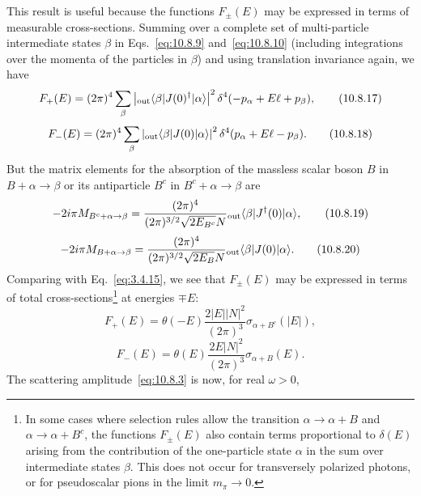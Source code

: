 This result is useful because the functions $F_\pm(E)$ may be expressed
in terms of measurable cross-sections. Summing over a complete set of
multi-particle intermediate states $\beta$ in Eqs.~\eqref{eq:10.8.9}
and~\eqref{eq:10.8.10} (including integrations over the momenta of the
particles in $\beta$) and using translation invariance again, we have
\begin{equation}
  F_+(E)=(2\pi)^4\sum_\beta
  \left|{}_{\mathrm{out}}\langle \beta\rvert J(0)^\dagger\lvert \alpha\rangle\right|^2
  \delta^4(-p_\alpha+E\ell+p_\beta),
  \tag{10.8.17}\label{eq:10.8.17}
\end{equation}
\begin{equation}
  F_-(E)=(2\pi)^4\sum_\beta
  \left|{}_{\mathrm{out}}\langle \beta\rvert J(0)\lvert \alpha\rangle\right|^2
  \delta^4(p_\alpha+E\ell-p_\beta).
  \tag{10.8.18}\label{eq:10.8.18}
\end{equation}
But the matrix elements for the absorption of the massless scalar boson
$B$ in $B+\alpha\to\beta$ or its antiparticle $B^c$ in
$B^c+\alpha\to\beta$ are
\begin{equation}
  -2i\pi M_{B^c+\alpha\to\beta}
  =\frac{(2\pi)^4}{(2\pi)^{3/2}\sqrt{2E_{B^c}}N}
  {}_{\mathrm{out}}\langle \beta\rvert J^\dagger(0)\lvert \alpha\rangle,
  \tag{10.8.19}\label{eq:10.8.19}
\end{equation}
\begin{equation}
  -2i\pi M_{B+\alpha\to\beta}
  =\frac{(2\pi)^4}{(2\pi)^{3/2}\sqrt{2E_B}N}
  {}_{\mathrm{out}}\langle \beta\rvert J(0)\lvert \alpha\rangle.
  \tag{10.8.20}\label{eq:10.8.20}
\end{equation}
Comparing with Eq.~\eqref{eq:3.4.15}, we see that $F_\pm(E)$ may be
expressed in terms of total cross-sections\footnote{In some cases where
selection rules allow the transition $\alpha\to\alpha+B$ and
$\alpha\to\alpha+B^c$, the functions $F_\pm(E)$ also contain terms
proportional to $\delta(E)$ arising from the contribution of the one-particle
state $\alpha$ in the sum over intermediate states $\beta$. This does not
occur for transversely polarized photons, or for pseudoscalar pions in the
limit $m_\pi\to0$.} at energies $\mp E$:
\begin{equation}
  F_+(E)=\theta(-E)\frac{2|E||N|^2}{(2\pi)^3}
  \sigma_{\alpha+B^c}(|E|),
  \tag{10.8.21}\label{eq:10.8.21}
\end{equation}
\begin{equation}
  F_-(E)=\theta(E)\frac{2E|N|^2}{(2\pi)^3}
  \sigma_{\alpha+B}(E).
  \tag{10.8.22}\label{eq:10.8.22}
\end{equation}
The scattering amplitude~\eqref{eq:10.8.3} is now, for real $\omega>0$,
